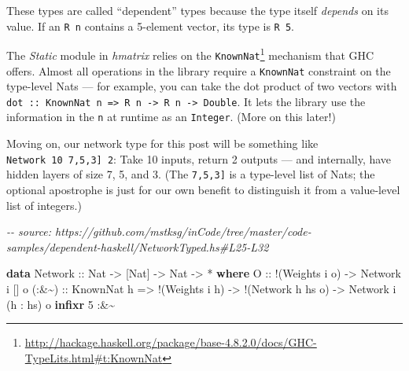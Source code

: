 \documentclass[]{article}
\newenvironment{Shaded}{}{}
\newcommand{\CommentTok}[1]{\textcolor[rgb]{0.38,0.63,0.69}{\textit{#1}}}
\newcommand{\DataTypeTok}[1]{\textcolor[rgb]{0.56,0.13,0.00}{#1}}
\newcommand{\DecValTok}[1]{\textcolor[rgb]{0.25,0.63,0.44}{#1}}
\newcommand{\KeywordTok}[1]{\textcolor[rgb]{0.00,0.44,0.13}{\textbf{#1}}}
\newcommand{\NormalTok}[1]{#1}
\newcommand{\OperatorTok}[1]{\textcolor[rgb]{0.40,0.40,0.40}{#1}}
\newcommand{\OtherTok}[1]{\textcolor[rgb]{0.00,0.44,0.13}{#1}}
\renewcommand{\href}[2]{#2\footnote{\url{#1}}}
\begin{document}
These types are called ``dependent'' types because the type itself
\emph{depends} on its value. If an \texttt{R\ n} contains a 5-element vector,
its type is \texttt{R\ 5}.

The \emph{Static} module in \emph{hmatrix} relies on the
\href{http://hackage.haskell.org/package/base-4.8.2.0/docs/GHC-TypeLits.html\#t:KnownNat}{\texttt{KnownNat}}
mechanism that GHC offers. Almost all operations in the library require a
\texttt{KnownNat} constraint on the type-level Nats --- for example, you can
take the dot product of two vectors with
\texttt{dot\ ::\ KnownNat\ n\ =\textgreater{}\ R\ n\ -\textgreater{}\ R\ n\ -\textgreater{}\ Double}.
It lets the library use the information in the \texttt{n} at runtime as an
\texttt{Integer}. (More on this later!)

Moving on, our network type for this post will be something like
\texttt{Network\ 10\ \textquotesingle{}{[}7,5,3{]}\ 2}: Take 10 inputs, return 2
outputs --- and internally, have hidden layers of size 7, 5, and 3. (The
\texttt{\textquotesingle{}{[}7,5,3{]}} is a type-level list of Nats; the
optional \texttt{\textquotesingle{}} apostrophe is just for our own benefit to
distinguish it from a value-level list of integers.)

\begin{Shaded}
\begin{Highlighting}[]
\CommentTok{{-}{-} source: https://github.com/mstksg/inCode/tree/master/code{-}samples/dependent{-}haskell/NetworkTyped.hs\#L25{-}L32}

\KeywordTok{data} \DataTypeTok{Network}\OtherTok{ ::} \DataTypeTok{Nat} \OtherTok{{-}\textgreater{}}\NormalTok{ [}\DataTypeTok{Nat}\NormalTok{] }\OtherTok{{-}\textgreater{}} \DataTypeTok{Nat} \OtherTok{{-}\textgreater{}} \OperatorTok{*} \KeywordTok{where}
    \DataTypeTok{O}\OtherTok{     ::} \OperatorTok{!}\NormalTok{(}\DataTypeTok{Weights}\NormalTok{ i o)}
          \OtherTok{{-}\textgreater{}} \DataTypeTok{Network}\NormalTok{ i \textquotesingle{}[] o}
\OtherTok{    (:\&\textasciitilde{}) ::} \DataTypeTok{KnownNat}\NormalTok{ h}
          \OtherTok{=\textgreater{}} \OperatorTok{!}\NormalTok{(}\DataTypeTok{Weights}\NormalTok{ i h)}
          \OtherTok{{-}\textgreater{}} \OperatorTok{!}\NormalTok{(}\DataTypeTok{Network}\NormalTok{ h hs o)}
          \OtherTok{{-}\textgreater{}} \DataTypeTok{Network}\NormalTok{ i (h \textquotesingle{}}\OperatorTok{:}\NormalTok{ hs) o}
\KeywordTok{infixr} \DecValTok{5} \OperatorTok{:\&\textasciitilde{}}
\end{Highlighting}
\end{Shaded}
\end{document}
